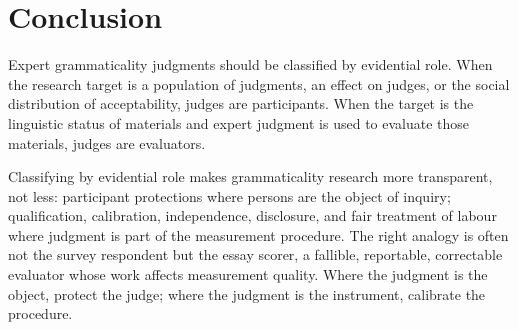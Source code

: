 \section{Conclusion}
\label{sec:conclusion}

Expert grammaticality judgments should be classified by evidential role. When the research target is a population of judgments, an effect on judges, or the social distribution of acceptability, judges are participants. When the target is the linguistic status of materials and expert judgment is used to evaluate those materials, judges are evaluators.

Classifying by evidential role makes grammaticality research more transparent, not less: participant protections where persons are the object of inquiry; qualification, calibration, independence, disclosure, and fair treatment of labour where judgment is part of the measurement procedure. The right analogy is often not the survey respondent but the essay scorer, a fallible, reportable, correctable evaluator whose work affects measurement quality. Where the judgment is the object, protect the judge; where the judgment is the instrument, calibrate the procedure.
